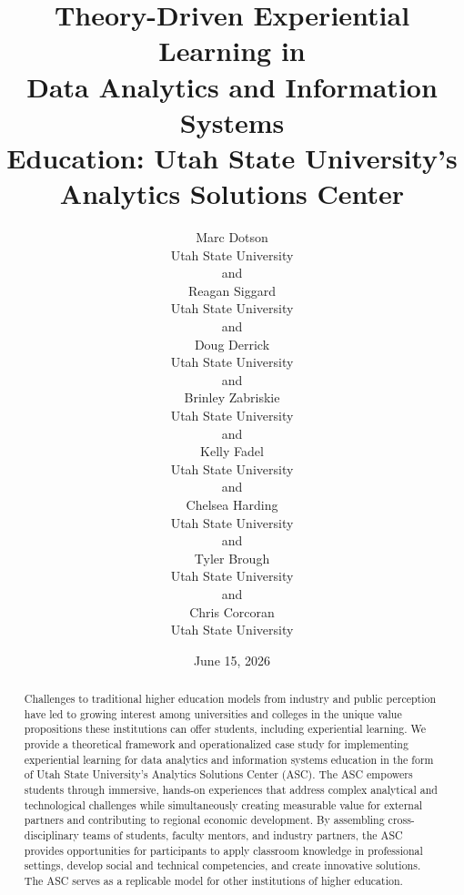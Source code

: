 \documentclass[
  12pt]{article}
\begin{document}
\def\spacingset#1{\renewcommand{\baselinestretch}%
{#1}\small\normalsize} \spacingset{1}



\date{June 15, 2026}
\title{\bf Theory-Driven Experiential Learning in\\
Data Analytics and Information Systems\\
Education: Utah State University's\\
Analytics Solutions Center}
\author{
Marc Dotson\\
Utah State University\\
and\\Reagan Siggard\\
Utah State University\\
and\\Doug Derrick\\
Utah State University\\
and\\Brinley Zabriskie\\
Utah State University\\
and\\Kelly Fadel\\
Utah State University\\
and\\Chelsea Harding\\
Utah State University\\
and\\Tyler Brough\\
Utah State University\\
and\\Chris Corcoran\\
Utah State University\\
}
\maketitle

\bigskip
\bigskip
\begin{abstract}
Challenges to traditional higher education models from industry and
public perception have led to growing interest among universities and
colleges in the unique value propositions these institutions can offer
students, including experiential learning. We provide a theoretical
framework and operationalized case study for implementing experiential
learning for data analytics and information systems education in the
form of Utah State University's Analytics Solutions Center (ASC). The
ASC empowers students through immersive, hands-on experiences that
address complex analytical and technological challenges while
simultaneously creating measurable value for external partners and
contributing to regional economic development. By assembling
cross-disciplinary teams of students, faculty mentors, and industry
partners, the ASC provides opportunities for participants to apply
classroom knowledge in professional settings, develop social and
technical competencies, and create innovative solutions. The ASC serves
as a replicable model for other institutions of higher education.
\end{abstract}
\end{document}
